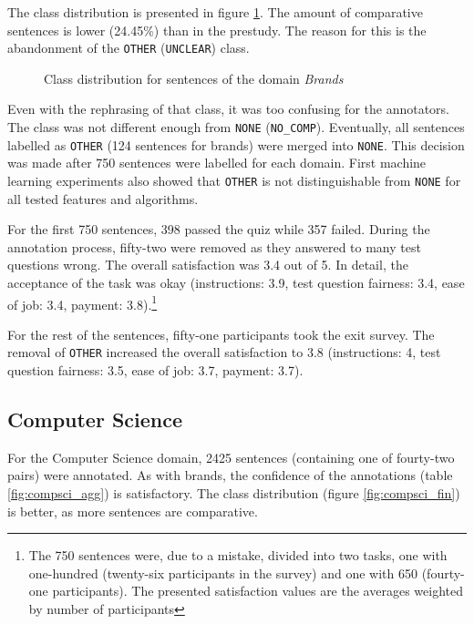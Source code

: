 The class distribution is presented in figure \ref{fig:brands_fin}. The amount of comparative sentences is lower (24.45\%) than in the prestudy. The reason for this is the abandonment of the \texttt{OTHER} (\texttt{UNCLEAR}) class. 

\begin{figure}[h]
\centering
\caption{Class distribution for sentences of the domain \emph{Brands}}
\label{fig:brands_fin}
\end{figure}



Even with the rephrasing of that class, it was too confusing for the annotators. The class was not different enough from \texttt{NONE} (\texttt{NO\_COMP}). Eventually, all sentences labelled as \texttt{OTHER} (124 sentences for brands) were merged into \texttt{NONE}. This decision was made after 750 sentences were labelled for each domain. First machine learning experiments also showed that \texttt{OTHER} is not distinguishable from \texttt{NONE} for all tested features and algorithms.

For the first 750 sentences, 398 passed the quiz while 357 failed. During the annotation process, fifty-two were removed as they answered to many test questions wrong. The overall satisfaction was 3.4 out of 5. In detail, the acceptance of the task was okay (instructions: 3.9, test question fairness: 3.4, ease of job: 3.4, payment: 3.8).\footnote{The 750 sentences were, due to a mistake, divided into two tasks, one with one-hundred (twenty-six participants in the survey) and one with 650 (fourty-one participants). The presented satisfaction values are the averages weighted by number of participants}

For the rest of the sentences, fifty-one participants took the exit survey. The removal of \texttt{OTHER} increased the overall satisfaction to 3.8 (instructions: 4, test question fairness: 3.5, ease of job: 3.7, payment: 3.7).


\subsection{Computer Science}
For the Computer Science domain, 2425 sentences (containing one of fourty-two pairs) were annotated. As with brands, the confidence of the annotations (table \ref{fig:compsci_agg}) is satisfactory. The class distribution (figure \ref{fig:compsci_fin}) is better, as more sentences are comparative.

